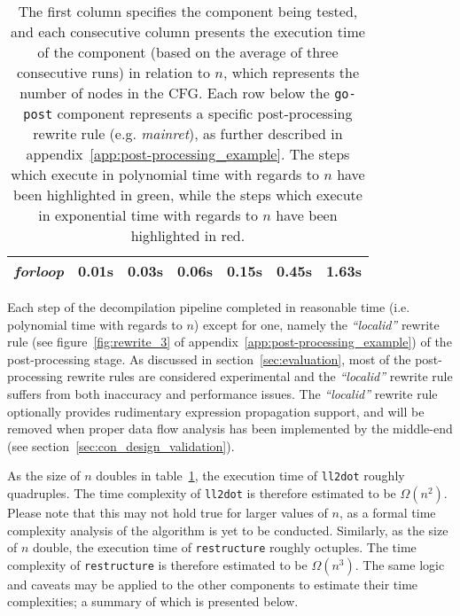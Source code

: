 \begin{table}[htbp]
\begin{center}
{\begin{tabular}{|l|l|l|l|l|l|l|}
				\rowcolor{light_green_3}
				\textit{forloop} & 0.01s & 0.03s & 0.06s & 0.15s & 0.45s & 1.63s \\
				\hline
			\end{tabular}
		}
	\end{center}
	\caption{The first column specifies the component being tested, and each consecutive column presents the execution time of the component (based on the average of three consecutive runs) in relation to $ n $, which represents the number of nodes in the CFG. Each row below the \texttt{go-post} component represents a specific post-processing rewrite rule (e.g. \textit{mainret}), as further described in appendix~\ref{app:post-processing_example}. The steps which execute in polynomial time with regards to $ n $ have been highlighted in green, while the steps which execute in exponential time with regards to $ n $ have been highlighted in red.}
	\label{tbl:run_time_summary}
\end{table}

Each step of the decompilation pipeline completed in reasonable time (i.e. polynomial time with regards to $ n $) except for one, namely the \textit{``localid''} rewrite rule (see figure~\ref{fig:rewrite_3} of appendix~\ref{app:post-processing_example}) of the post-processing stage. As discussed in section~\ref{sec:evaluation}, most of the post-processing rewrite rules are considered experimental and the \textit{``localid''} rewrite rule suffers from both inaccuracy and performance issues. The \textit{``localid''} rewrite rule optionally provides rudimentary expression propagation support, and will be removed when proper data flow analysis has been implemented by the middle-end (see section~\ref{sec:con_design_validation}).

As the size of $ n $ doubles in table~\ref{tbl:run_time_summary}, the execution time of \texttt{ll2dot} roughly quadruples. The time complexity of \texttt{ll2dot} is therefore estimated to be $ \Omega(n^{2}) $. Please note that this may not hold true for larger values of $ n $, as a formal time complexity analysis of the algorithm is yet to be conducted. Similarly, as the size of $ n $ double, the execution time of \texttt{restructure} roughly octuples. The time complexity of \texttt{restructure} is therefore estimated to be $ \Omega(n^{3}) $. The same logic and caveats may be applied to the other components to estimate their time complexities; a summary of which is presented below.

